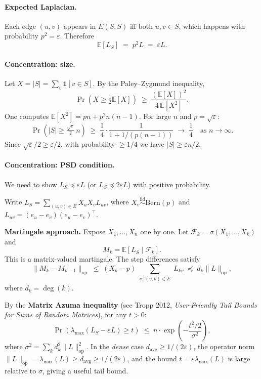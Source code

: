 \documentclass[12pt]{article}
\theoremstyle{definition}
\theoremstyle{remark}
\begin{document}
\paragraph{Expected Laplacian.}
Each edge $(u,v)$ appears in $E(S,S)$ iff both $u,v \in S$, which happens with probability $p^2 = \varepsilon$.  Therefore
\[
  \mathbb{E}[L_S] \;=\; p^2 L \;=\; \varepsilon L.
\]

\paragraph{Concentration: size.}
Let $X = |S| = \sum_v \mathbf{1}[v \in S]$.  By the Paley--Zygmund inequality,
\[
  \Pr\!\left(X \ge \tfrac{1}{2}\mathbb{E}[X]\right)
  \;\ge\; \frac{(\mathbb{E}[X])^2}{4\,\mathbb{E}[X^2]}.
\]
One computes $\mathbb{E}[X^2] = pn + p^2 n(n-1)$.  For large $n$ and $p = \sqrt{\varepsilon}$:
\[
  \Pr\!\left(|S| \ge \tfrac{\sqrt{\varepsilon}}{2}\,n\right) \;\ge\; \frac{1}{4}\cdot \frac{1}{1 + 1/(p(n-1))} \;\to\; \frac{1}{4}\quad\text{as }n\to\infty.
\]
Since $\sqrt{\varepsilon}/2 \ge \varepsilon/2$, with probability $\ge 1/4$ we have $|S| \ge \varepsilon n/2$.

\paragraph{Concentration: PSD condition.}
We need to show $L_S \preceq \varepsilon L$ (or $L_S \preceq 2\varepsilon L$) with positive probability.

Write $L_S = \sum_{(u,v)\in E} X_u X_v L_{uv}$, where $X_v \overset{\mathrm{iid}}{\sim} \mathrm{Bern}(p)$ and $L_{uv} = (e_u - e_v)(e_u - e_v)^\top$.

\textbf{Martingale approach.}  Expose $X_1, \ldots, X_n$ one by one.  Let $\mathcal{F}_k = \sigma(X_1,\ldots,X_k)$ and
\[
  M_k = \mathbb{E}[L_S \mid \mathcal{F}_k].
\]
This is a matrix-valued martingale.  The step differences satisfy
\[
  \|M_k - M_{k-1}\|_{\mathrm{op}}
  \;\le\; (X_k - p)\sum_{\substack{v:\,(v,k)\in E}} L_{kv}
  \;\preceq\; d_k \|L\|_{\mathrm{op}},
\]
where $d_k = \deg(k)$.

By the \textbf{Matrix Azuma inequality} (see Tropp 2012, \emph{User-Friendly Tail Bounds for Sums of Random Matrices}), for any $t > 0$:
\[
  \Pr\!\left(\lambda_{\max}\!\left(L_S - \varepsilon L\right) \ge t\right)
  \;\le\; n \cdot \exp\!\left(-\frac{t^2/2}{\sigma^2}\right),
\]
where $\sigma^2 = \sum_k d_k^2 \|L\|_{\mathrm{op}}^2$.  In the \emph{dense} case $d_{\mathrm{avg}} \ge 1/(2\varepsilon)$, the operator norm $\|L\|_{\mathrm{op}} = \lambda_{\max}(L) \ge d_{\mathrm{avg}} \ge 1/(2\varepsilon)$, and the bound $t = \varepsilon \lambda_{\max}(L)$ is large relative to $\sigma$, giving a useful tail bound.
\end{document}
